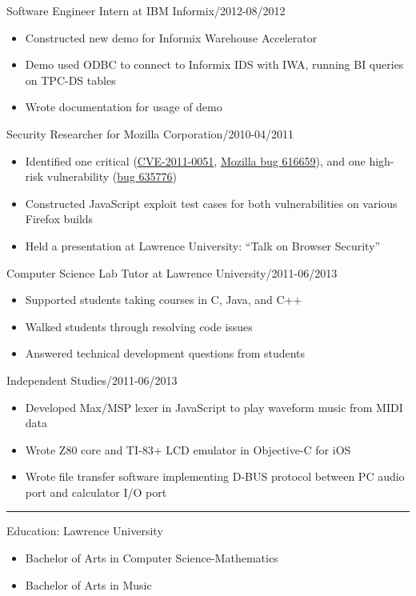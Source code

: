 \documentclass[letterpaper, 11pt]{article}
\newcommand{\superbold}[1]{{\fontseries{b}\selectfont#1}}
\newcommand{\dottitle}[2]{\flushleft\normalsize\superbold{#1\dotfill#2}}
\newcommand{\jobStart}[2]{
    \dottitle{#1}{#2}\vspace{-0.05cm}
    \begin{itemize}
}
\newcommand{\jobEnd}{
    \end{itemize}\vspace{0.05cm}
}
\begin{document}
\jobStart{Software Engineer Intern at IBM Informix}{06/2012-08/2012}
    \item Constructed new demo for Informix Warehouse Accelerator
    \item Demo used ODBC to connect to Informix IDS with IWA, running BI queries on TPC-DS tables
    \item Wrote documentation for usage of demo
\jobEnd

\jobStart{Security Researcher for Mozilla Corporation}{09/2010-04/2011}
    \item Identified one critical (\href{https://cve.mitre.org/cgi-bin/cvename.cgi?name=CVE-2011-0051}{CVE-2011-0051}, \href{https://www.mozilla.org/en-US/security/advisories/mfsa2011-02}{Mozilla bug 616659}), and one high-risk vulnerability (\href{https://bugzilla.mozilla.org/show_bug.cgi?id=635776}{bug 635776})
    \item Constructed JavaScript exploit test cases for both vulnerabilities on various Firefox builds
    \item Held a presentation at Lawrence University: “Talk on Browser Security”
\jobEnd

\jobStart{Computer Science Lab Tutor at Lawrence University}{09/2011-06/2013}
    \item Supported students taking courses in C, Java, and C++
    \item Walked students through resolving code issues
    \item Answered technical development questions from students
\jobEnd

\jobStart{Independent Studies}{09/2011-06/2013}
    \item Developed Max/MSP lexer in JavaScript to play waveform music from MIDI data
    \item Wrote Z80 core and TI-83+ LCD emulator in Objective-C for iOS
    \item Wrote file transfer software implementing D-BUS protocol between PC audio port and calculator I/O port
\jobEnd

\hrule\vspace{0.3cm}

{
    \dottitle{Education: Lawrence University}{2013}\vspace{-0.05cm}
    \begin{itemize}[label={}]
        \item Bachelor of Arts in Computer Science-Mathematics
        \item Bachelor of Arts in Music
    \end{itemize}
}
\end{document}
